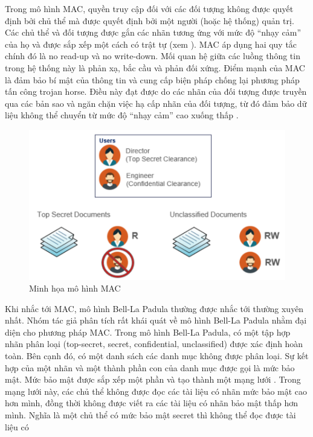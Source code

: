 Trong mô hình MAC, quyền truy cập đối với các đối tượng không được quyết
định bởi chủ thể mà được quyết định bởi một người (hoặc hệ thống) quản trị. Các chủ
thể và đối tượng được gắn các nhãn tương ứng với mức độ “nhạy cảm” của họ và được
sắp xếp một cách có trật tự (xem ). MAC áp dụng hai quy tắc chính đó là
no read-up và no write-down. Mối quan hệ giữa các luồng thông tin trong hệ thống này
là phản xạ, bắc cầu và phản đối xứng. Điểm mạnh của MAC là đảm bảo bí mật của thông
tin và cung cấp biện pháp chống lại phương pháp tấn công trojan horse. Điều này đạt
được do các nhãn của đối tượng được truyền qua các bản sao và ngăn chặn việc hạ cấp
nhãn của đối tượng, từ đó đảm bảo dữ liệu không thể chuyển từ mức độ “nhạy cảm” cao
xuống thấp \cite{nyanchama1996modeling}. \\
\begin{figure}
    \centering
    \includegraphics[scale=0.5]{graphics/chapter-2/chap2-mac.png}
    \caption{Minh họa mô hình MAC}
    \label{fig:chap2-mac}
\end{figure}
\indent Khi nhắc tới MAC, mô hình Bell-La Padula \cite{bell1973secure} thường được nhắc tới thường xuyên nhất. Nhóm tác giả phân tích rất khái quát về mô hình Bell-La Padula nhằm đại
diện cho phương pháp MAC. Trong mô hình Bell-La Padula, có một tập hợp nhãn phân loại (top-secret, secret,
confidential, unclassified) được xác định hoàn toàn. Bên cạnh đó, có một danh sách các
danh mục không được phân loại. Sự kết hợp của một nhãn và một thành phần con của
danh mục được gọi là mức bảo mật. Mức bảo mật được sắp xếp một phần và tạo thành
một mạng lưới \cite{osborn1997mandatory}. Trong mạng lưới này, các chủ thể không được đọc các tài liệu có nhãn mức bảo
mật cao hơn mình, đồng thời không được viết ra các tài liệu có nhãn bảo mật thấp hơn
mình. Nghĩa là một chủ thể có mức bảo mật secret thì không thể đọc được tài liệu có
